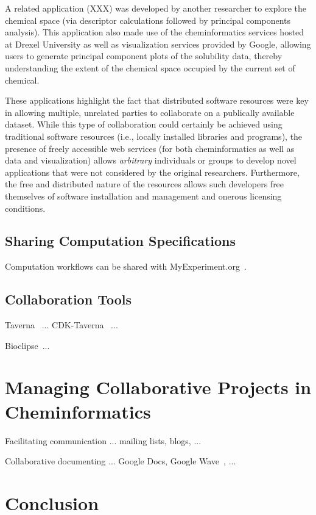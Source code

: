 \documentclass[12pt]{book}
\begin{document}
A related application (XXX) was developed by another researcher to
explore the chemical space (via descriptor calculations followed by
principal components analysis). This application also made use of the
cheminformatics services hosted at Drexel University as well as
visualization services provided by Google, allowing users to generate
principal component plots of the solubility data, thereby
understanding the extent of the chemical space occupied by the current
set of chemical.

These applications highlight the fact that distributed software
resources were key in allowing multiple, unrelated parties to
collaborate on a publically available dataset. While this type of
collaboration could certainly be achieved using traditional software
resources (i.e., locally installed libraries and programs), the
presence of freely accessible web services (for both cheminformatics
as well as data and visualization) allows \emph{arbitrary} individuals
or groups to develop novel applications that were not considered by
the original researchers. Furthermore, the free and distributed nature
of the resources allows such developers free themselves of software
installation and management and onerous licensing conditions.


\subsection{Sharing Computation Specifications}

Computation workflows can be shared with MyExperiment.org~\cite{Goble2010}.

\subsection{Collaboration Tools}

Taverna~\cite{Oinn2004} ... CDK-Taverna~\cite{Kuhn2010} ...

Bioclipse~\cite{Spjuth2009,Spjuth2007}...

\section{Managing Collaborative Projects in Cheminformatics}

Facilitating communication ... mailing lists, blogs, ...

Collaborative documenting ... Google Docs, Google Wave~\cite{Neylon2009}, ...

\section{Conclusion}



\end{document}
